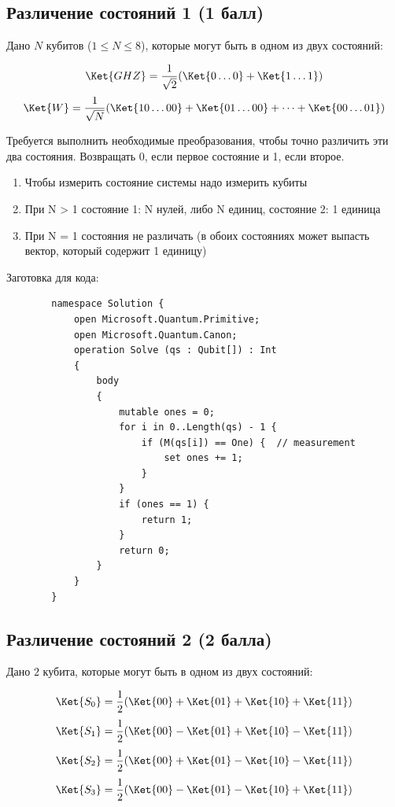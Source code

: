 \documentclass{article}
\begin{document}
\subsection{Различение состояний 1 (1 балл)}

Дано $N$ кубитов ($1 \le N \le 8$), которые могут быть в одном из двух состояний:

$$\Ket{GHZ} = \frac{1}{\sqrt2}(\Ket{0\dots0} +\Ket{1\dots1})$$
$$\Ket{W} = \frac{1}{\sqrt N}(\Ket{10\dots00}+\Ket{01\dots00} + \dots +\Ket{00\dots01})$$

Требуется выполнить необходимые преобразования, чтобы точно различить эти два состояния. Возвращать $0$, если первое состояние и 1, если второе. 
\begin{enumerate}
    \item Чтобы измерить состояние системы надо измерить кубиты
    \item При N > 1 состояние 1: N нулей, либо N единиц, состояние 2: 1 единица
    \item При N = 1 состояния не различать (в обоих состояниях может выпасть вектор, который содержит 1 единицу)
\end{enumerate}
Заготовка для кода:
    \begin{lstlisting}
        namespace Solution {
            open Microsoft.Quantum.Primitive;
            open Microsoft.Quantum.Canon;
            operation Solve (qs : Qubit[]) : Int 
            {
                body
                {
                    mutable ones = 0;
                    for i in 0..Length(qs) - 1 {
                        if (M(qs[i]) == One) {  // measurement
                            set ones += 1;
                        }
                    }
                    if (ones == 1) {
                        return 1;
                    }
                    return 0;
                }
            }
        }
    \end{lstlisting}


\subsection{Различение состояний 2 (2 балла)}

Дано $2$ кубита, которые могут быть в одном из двух состояний:

$$\Ket{S_0} = \frac{1}{2}(\Ket{00} + \Ket{01} + \Ket{10} + \Ket{11})$$
$$\Ket{S_1} = \frac{1}{2}(\Ket{00} - \Ket{01} + \Ket{10} - \Ket{11})$$
$$\Ket{S_2} = \frac{1}{2}(\Ket{00} + \Ket{01} - \Ket{10} - \Ket{11})$$
$$\Ket{S_3} = \frac{1}{2}(\Ket{00} - \Ket{01} - \Ket{10} + \Ket{11})$$
\end{document}
